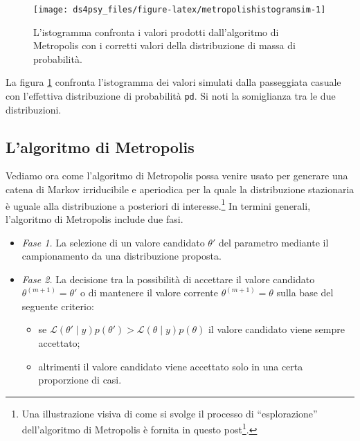 \documentclass[
  11pt,
]{krantz}
\providecommand{\tightlist}{%
  \setlength{\itemsep}{0pt}\setlength{\parskip}{0pt}}
\renewcommand{\href}[2]{#2\footnote{\url{#1}}}
\theoremstyle{definition}
\theoremstyle{definition}
\theoremstyle{definition}
\theoremstyle{definition}
\theoremstyle{remark}
\begin{document}
\begin{figure}[h]

{\centering \texttt{[image: ds4psy\_files/figure-latex/metropolishistogramsim-1]} 

}

\caption{L'istogramma confronta i valori prodotti dall'algoritmo di Metropolis con i corretti valori della distribuzione di massa di probabilità.}\label{fig:metropolishistogramsim}
\end{figure}

La figura \ref{fig:metropolishistogramsim} confronta l'istogramma dei valori simulati dalla passeggiata casuale con l'effettiva distribuzione di probabilità \texttt{pd}. Si noti la somiglianza tra le due distribuzioni.

\hypertarget{lalgoritmo-di-metropolis}{%
\subsection{L'algoritmo di Metropolis}\label{lalgoritmo-di-metropolis}}

Vediamo ora come l'algoritmo di Metropolis possa venire usato per generare una catena di Markov irriducibile e aperiodica per la quale la distribuzione stazionaria è uguale alla distribuzione a posteriori di interesse.\footnote{Una illustrazione visiva di come si svolge il processo di ``esplorazione'' dell'algoritmo di Metropolis è fornita in questo \href{https://elevanth.org/blog/2017/11/28/build-a-better-markov-chain/}{post}.} In termini generali, l'algoritmo di Metropolis include due fasi.

\begin{itemize}
\tightlist
\item
  \emph{Fase 1.} La selezione di un valore candidato \(\theta'\) del parametro mediante il campionamento da una distribuzione proposta.
\item
  \emph{Fase 2.} La decisione tra la possibilità di accettare il valore candidato \(\theta^{(m+1)} = \theta'\) o di mantenere il valore corrente \(\theta^{(m+1)} = \theta\) sulla base del seguente criterio:

  \begin{itemize}
  \tightlist
  \item
    se \(\mathcal{L}(\theta' \mid y)p(\theta') > \mathcal{L}(\theta \mid y)p(\theta)\) il valore candidato viene sempre accettato;
  \item
    altrimenti il valore candidato viene accettato solo in una certa proporzione di casi.
  \end{itemize}
\end{itemize}
\end{document}
